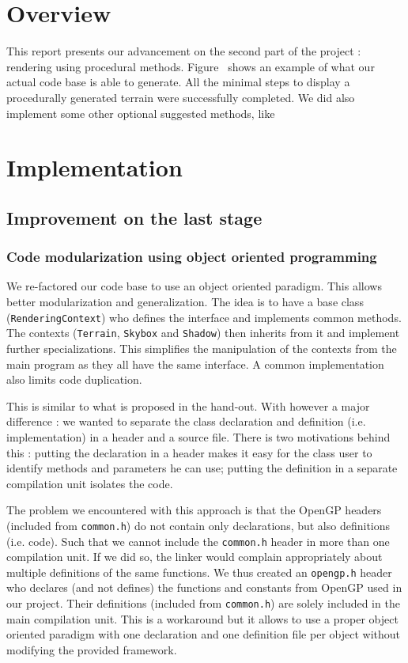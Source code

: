 \documentclass[a4paper,11pt]{article}
\begin{document}
\section{Overview}

This report presents our advancement on the second part of the project : rendering using procedural methods. Figure~ shows an example of what our actual code base is able to generate. All the minimal steps to display a procedurally generated terrain were successfully completed. We did also implement some other optional suggested methods, like 


\section{Implementation}

\subsection{Improvement on the last stage}

\subsubsection{Code modularization using object oriented programming}

We re-factored our code base to use an object oriented paradigm. This allows better modularization and generalization. The idea is to have a base class (\texttt{RenderingContext}) who defines the interface and implements common methods. The contexts (\texttt{Terrain}, \texttt{Skybox} and \texttt{Shadow}) then inherits from it and implement further specializations. This simplifies the manipulation of the contexts from the main program as they all have the same interface. A common implementation also limits code duplication.

This is similar to what is proposed in the hand-out. With however a major difference : we wanted to separate the class declaration and definition (i.e. implementation) in a header and a source file. There is two motivations behind this : putting the declaration in a header makes it easy for the class user to identify methods and parameters he can use; putting the definition in a separate compilation unit isolates the code.

The problem we encountered with this approach is that the OpenGP headers (included from \texttt{common.h}) do not contain only declarations, but also definitions (i.e. code). Such that we cannot include the \texttt{common.h} header in more than one compilation unit. If we did so, the linker would complain appropriately about multiple definitions of the same functions. We thus created an \texttt{opengp.h} header who declares (and not defines) the functions and constants from OpenGP used in our project. Their definitions (included from \texttt{common.h}) are solely included in the main compilation unit. This is a workaround but it allows to use a proper object oriented paradigm with one declaration and one definition file per object without modifying the provided framework.
\end{document}
